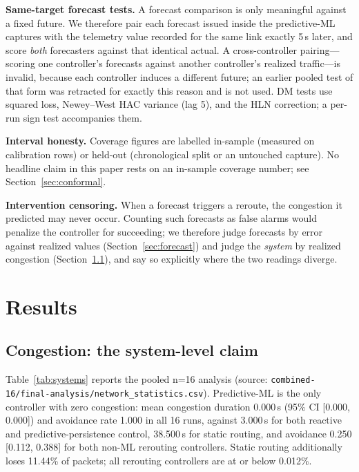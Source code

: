 \documentclass[conference]{IEEEtran}
\begin{document}
\textbf{Same-target forecast tests.} A forecast comparison is only
meaningful against a fixed future. We therefore pair each forecast
issued inside the predictive-ML captures with the telemetry value
recorded for the same link exactly 5\,s later, and score
\emph{both} forecasters against that identical actual. A
cross-controller pairing---scoring one controller's forecasts against
another controller's realized traffic---is invalid, because each
controller induces a different future; an earlier pooled test of that
form was retracted for exactly this reason and is not used. DM tests
use squared loss, Newey--West HAC variance (lag 5), and the HLN
correction; a per-run sign test accompanies them.

\textbf{Interval honesty.} Coverage figures are labelled in-sample
(measured on calibration rows) or held-out (chronological split or an
untouched capture). No headline claim in this paper rests on an
in-sample coverage number; see Section~\ref{sec:conformal}.

\textbf{Intervention censoring.} When a forecast triggers a reroute,
the congestion it predicted may never occur. Counting such forecasts
as false alarms would penalize the controller for succeeding; we
therefore judge forecasts by error against realized values
(Section~\ref{sec:forecast}) and judge the \emph{system} by realized
congestion (Section~\ref{sec:congestion}), and say so explicitly
where the two readings diverge.

\section{Results}
\label{sec:results}

\subsection{Congestion: the system-level claim}
\label{sec:congestion}
Table~\ref{tab:systems} reports the pooled n=16 analysis
(source: \texttt{combined-16/final-analysis/network\_statistics.csv}).
Predictive-ML is the only controller with zero congestion: mean
congestion duration 0.000\,s (95\% CI [0.000, 0.000]) and avoidance
rate 1.000 in all 16 runs, against 3.000\,s for both reactive and
predictive-persistence control, 38.500\,s for static routing, and
avoidance 0.250 [0.112, 0.388] for both non-ML rerouting controllers.
Static routing additionally loses 11.44\% of packets; all rerouting
controllers are at or below 0.012\%.
\end{document}
